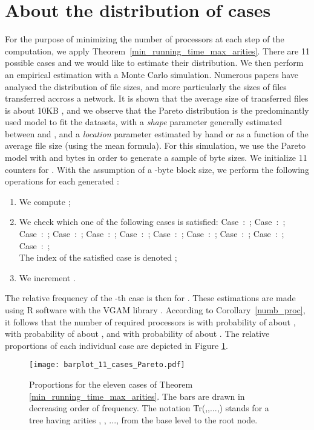 \documentclass{llncs}
\begin{document}
\section{About the distribution of cases}\label{prob_dist}

For the purpose of minimizing the number of processors at each step of the computation, we apply Theorem~\ref{min_running_time_max_arities}. 
There are 11 possible cases and we would like to estimate their distribution. We then perform an empirical estimation with a Monte Carlo simulation.
Numerous papers have analysed the distribution of file sizes, and more particularly the sizes of files transferred accross a network. 
It is shown that the average size of transferred files is about 10KB \cite{TMW97,WAWB05,BC98}, and we observe that
the Pareto distribution
is the predominantly used model \cite{BC98,Dow05,WAWB05,HSBA2003} to fit the datasets, with a \emph{shape} parameter  generally estimated between  and ,
and a \emph{location} parameter  estimated by hand or as a function of the average file size (using the mean formula). For this simulation, 
we use the Pareto model with  and 
 bytes in order to generate a sample of  byte sizes.
We initialize 11 counters  for . 
With the assumption of a -byte block size, we perform the following operations for each generated :
\begin{enumerate}
 \item We compute ;
 \item We check which one of the following cases is satisfied:
 Case~:~;
 Case~:~;
 Case~:~;
 Case~:~;
 Case~:~;
 Case~:~;
 Case~:~;
 Case~:~;
 Case~:~;
 Case~:~;
 Case~:~;~\\
 The index of the satisfied case is denoted ;
 \item We increment .
\end{enumerate}
The relative frequency of the -th case is then  for .
These estimations are made using R software \cite{RCTEAM} with the VGAM library \cite{Yee10}.
According to Corollary~\ref{numb_proc},
it follows that the number of required processors is  with probability 
of about , 
with probability of about , and  with 
probability of about .
The relative proportions of each individual case are depicted in Figure \ref{barplot_11_cases}.
\begin{figure}[h]
 \centering
 \texttt{[image: barplot\_11\_cases\_Pareto.pdf]}
 \caption{Proportions for the eleven cases of Theorem \ref{min_running_time_max_arities}. The bars are drawn in decreasing order of frequency.
 The notation Tr(,,...,) stands for a tree having arities , , ...,  from the base level to the root node.}
 \label{barplot_11_cases}
\end{figure}
\end{document}

